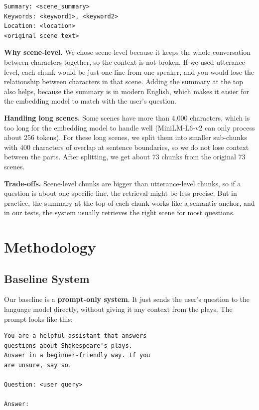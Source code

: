 \documentclass[10pt,conference]{IEEEtran}
\begin{document}
\begin{lstlisting}[language={}]
Summary: <scene_summary>
Keywords: <keyword1>, <keyword2>
Location: <location>
<original scene text>
\end{lstlisting}

\textbf{Why scene-level.} We chose scene-level because it keeps the whole conversation between characters together, so the context is not broken. If we used utterance-level, each chunk would be just one line from one speaker, and you would lose the relationship between characters in that scene. Adding the summary at the top also helps, because the summary is in modern English, which makes it easier for the embedding model to match with the user's question.

\textbf{Handling long scenes.} Some scenes have more than 4,000 characters, which is too long for the embedding model to handle well (MiniLM-L6-v2 can only process about 256 tokens). For these long scenes, we split them into smaller sub-chunks with 400 characters of overlap at sentence boundaries, so we do not lose context between the parts. After splitting, we get about 73 chunks from the original 73 scenes.

\textbf{Trade-offs.} Scene-level chunks are bigger than utterance-level chunks, so if a question is about one specific line, the retrieval might be less precise. But in practice, the summary at the top of each chunk works like a semantic anchor, and in our tests, the system usually retrieves the right scene for most questions.

\section{Methodology}
\label{sec:methodology}

\subsection{Baseline System}

Our baseline is a \textbf{prompt-only system}. It just sends the user's question to the language model directly, without giving it any context from the plays. The prompt looks like this:

\begin{lstlisting}[language={}]
You are a helpful assistant that answers
questions about Shakespeare's plays.
Answer in a beginner-friendly way. If you
are unsure, say so.

Question: <user query>

Answer:
\end{lstlisting}
\end{document}
